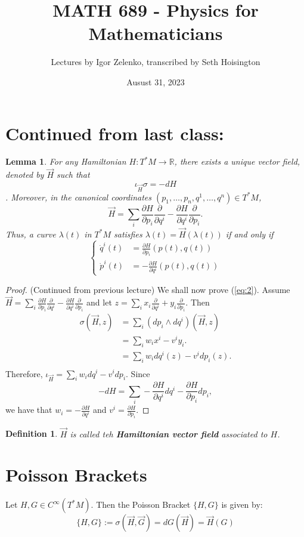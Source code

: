 \documentclass{article}
\title{MATH 689 - Physics for Mathematicians}
\author{Lectures by Igor Zelenko, transcribed by Seth Hoisington}
\date{Ausust 31, 2023}
\newcommand{\R}{\mathbb R}
\newcommand{\pd}[1]{\frac{\partial}{\partial #1}}
\newcommand{\pdof}[2]{\frac{\partial #1}{\partial #2}}
\newtheorem{defn}{Definition}
\newtheorem{lm}{Lemma}
\begin{document}
\maketitle
\section{Continued from last class:}
\begin{lm}
    For any Hamiltonian $H:T^*M\to \R$, there exists a unique vector field, denoted by $\vec{H}$ such that 
    \begin{equation}
        \iota_{\vec H} \sigma = -dH
    \end{equation}. Moreover, in the canonical coordinates $(p_1,\dots, p_n,q^1,\dots,q^n)\in T^*M$,
    \begin{equation}\label{eq:2}
        \vec H = \sum_{i} \pdof{H}{p_i}\pd{q^i} - \pdof{H}{q^i}\pd{p_i}.
    \end{equation}
    Thus, a curve $\lambda(t)$ in $T^*M$ satisfies $\lambda(t) = \vec H(\lambda(t))$ if and only if 
    \[\left\{\begin{aligned}
        \dot q^i(t) &= \pdof{H}{p_i}(p(t), q(t))\\
        \dot p^i(t) &= -\pdof{H}{q^i}(p(t), q(t))
    \end{aligned}\right.\]
\end{lm}
\begin{proof}
    (Continued from previous lecture) We shall now prove (\ref{eq:2}). Assume $\vec H = \sum_{i} \pdof{H}{p_i}\pd{q^i} - \pdof{H}{q^i}\pd{p_i}$ and let $z = \sum_{i} x_i\pd{q^i} + y_i\pd{p_i}$. Then
    \begin{align*}
        \sigma(\vec{H},z) &= \sum_i (dp_i\wedge dq^i)(\vec{H},z)\\
        &=\sum_i w_ix^i - v^iy_i.\\
        &=\sum_i w_idq^i(z) - v^idp_i(z).\\
    \end{align*}
    Therefore, $\iota_{\vec H} = \sum_i w_idq^i - v^idp_i$. Since
    \[-dH = \sum_i -\pdof{H}{q^i}dq^i - \pdof{H}{p_i}dp_i,\]
    we have that $w_i = -\pdof{H}{q^i}$ and $v^i = \pdof{H}{p_i}$.
\end{proof}
\begin{defn}
    $\vec H$ is called teh \textbf{Hamiltonian vector field} associated to $H$.
\end{defn}
\section{Poisson Brackets}
Let $H,G\in C^\infty(T^*M)$. Then the Poisson Bracket $\{H,G\}$ is given by:
\[\{H,G\}:= \sigma(\vec{H},\vec G) = dG(\vec H) = \vec H(G)\]
\end{document}

